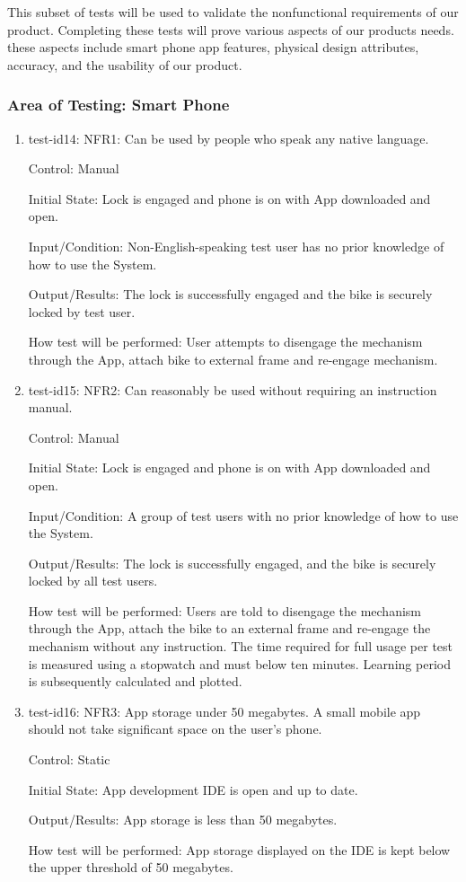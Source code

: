 \documentclass[12pt, titlepage]{article}
\begin{document}
This subset of tests will be used to validate the nonfunctional requirements of our product. Completing these tests will prove various aspects of our products needs. these aspects include smart phone app features, physical design attributes, accuracy, and the usability of our product.

\subsubsection{Area of Testing: Smart Phone}

\begin{enumerate}

\item{test-id14: NFR1: Can be used by people who speak any native language. \\}

Control: Manual

Initial State: Lock is engaged and phone is on with App downloaded and open.

Input/Condition: Non-English-speaking test user has no prior knowledge of how to use the System.

Output/Results: The lock is successfully engaged and the bike is securely locked by test user.

How test will be performed: User attempts to disengage the mechanism through the App, attach bike to external frame and re-engage mechanism.
					
\item{test-id15: NFR2: Can reasonably be used without requiring an instruction manual. \\}

Control: Manual

Initial State: Lock is engaged and phone is on with App downloaded and open.

Input/Condition: A group of test users with no prior knowledge of how to use the System. 

Output/Results: The lock is successfully engaged, and the bike is securely locked by all test users.

How test will be performed: Users are told to disengage the mechanism through the App, attach the bike to an external frame and re-engage the mechanism without any instruction. The time required for full usage per test is measured using a stopwatch and must below ten minutes. Learning period is subsequently calculated and plotted. 

\item{test-id16: NFR3: App storage under 50 megabytes. A small mobile app should not take significant space on the user’s phone.  \\}

Control: Static 

Initial State: App development IDE is open and up to date.

Output/Results: App storage is less than 50 megabytes.

How test will be performed: App storage displayed on the IDE is kept below the upper threshold of 50 megabytes. 

\end{enumerate}
\end{document}
